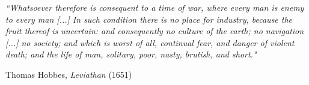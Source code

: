 \pagestyle{empty}

\null\vfill

\textit{``Whatsoever therefore is consequent to a time of war, where every man is enemy to every man [...] In such condition there is no place for industry, because the fruit thereof is uncertain: and consequently no culture of the earth; no navigation [...] no society; and which is worst of all, continual fear, and danger of violent death; and the life of man, solitary, poor, nasty, brutish, and short."}

\begin{flushright}
Thomas Hobbes, \textit{Leviathan} (1651)
\end{flushright}

\vfill\vfill\vfill\vfill\vfill\vfill\null

\clearpage
